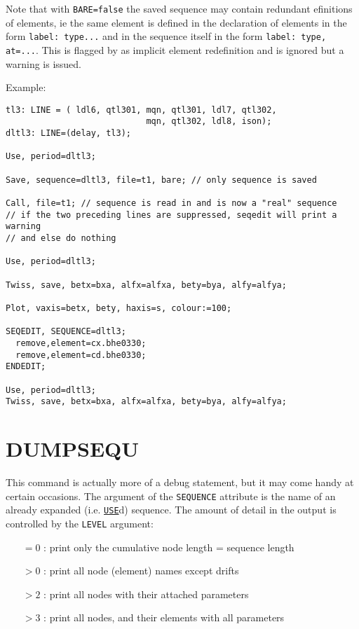  

Note that with {\tt BARE=false} the saved sequence may contain redundant 
efinitions of elements, ie the same element is defined in the declaration 
of elements in the form {\tt label:\ type...} and in the sequence itself 
in the form {\tt label:\ type, at=...}. This is flagged by \madx as implicit 
element redefinition and is ignored but a warning is issued. 

Example:  
\begin{verbatim}
tl3: LINE = ( ldl6, qtl301, mqn, qtl301, ldl7, qtl302,
                            mqn, qtl302, ldl8, ison);
dltl3: LINE=(delay, tl3);

Use, period=dltl3;

Save, sequence=dltl3, file=t1, bare; // only sequence is saved

Call, file=t1; // sequence is read in and is now a "real" sequence
// if the two preceding lines are suppressed, seqedit will print a warning
// and else do nothing

Use, period=dltl3;

Twiss, save, betx=bxa, alfx=alfxa, bety=bya, alfy=alfya;

Plot, vaxis=betx, bety, haxis=s, colour:=100;

SEQEDIT, SEQUENCE=dltl3;
  remove,element=cx.bhe0330;
  remove,element=cd.bhe0330;
ENDEDIT;

Use, period=dltl3;
Twiss, save, betx=bxa, alfx=alfxa, bety=bya, alfy=alfya;
\end{verbatim}


\section{DUMPSEQU}
\label{sec:dumpsequ}
This command is actually more of a debug statement, but it may come handy at certain
occasions. The argument of the {\tt SEQUENCE} attribute is the name of an
already expanded (i.e. \hyperref[sec:use]{\tt USE}d) sequence. The amount of 
detail in the output is controlled by the {\tt LEVEL} argument:
\begin{itemize}
\item[$=0$ : ]    print only the cumulative node length = sequence length
\item[$>0$ : ]    print all node (element) names except drifts
\item[$>2$ : ]    print all nodes with their attached parameters
\item[$>3$ : ]    print all nodes, and their elements with all parameters
\end{itemize}



